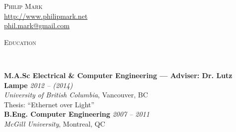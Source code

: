 \documentclass[10pt]{article}
\newenvironment{changemargin}[2]{%
  \begin{list}{}{%
    \setlength{\topsep}{0pt}%
    \setlength{\leftmargin}{#1}%
    \setlength{\rightmargin}{#2}%
    \setlength{\listparindent}{\parindent}%
    \setlength{\itemindent}{\parindent}%
    \setlength{\parsep}{\parskip}%
  }%
  \item[]}{\end{list}
}
\newcommand{\lineover}{
  \begin{changemargin}{-0.05in}{-0.05in}
    \vspace*{-8pt}
    \hrulefill \\
    \vspace*{-2pt}
  \end{changemargin}
}
\renewcommand{\section}[1]{
  \begin{changemargin}{-0.5in}{-0.5in}
    \normalsize \scshape{#1}\\
    \lineover
  \end{changemargin}
}
\newcommand{\contact}[3]{
  \begin{changemargin}{-0.5in}{-0.5in}
    \begin{center}
      {\LARGE \scshape {#1}}\\ \smallskip
      {\url{#2}}\\ \smallskip
      {\href{mailto:#3}{#3}}\\ \smallskip
    \end{center}
  \end{changemargin}
}
\newenvironment{body} {
  \vspace{2pt}
  \begin{changemargin}{-0.25in}{-0.5in}
    }{
  \end{changemargin}
}
\begin{document}
\contact{Philip Mark}{http://www.philipmark.net}{phil.mark@gmail.com}

% 
% 

\section{Education}
\begin{body}
\textbf{M.A.Sc Electrical \& Computer Engineering --- Adviser: Dr. Lutz Lampe}
\hfill \emph{2012 -- (2014)}{} \\
\emph{University of British Columbia}, Vancouver, BC \\
Thesis: ``Ethernet over Light''\\ %
\medskip
\textbf{B.Eng. Computer Engineering} \hfill \emph{2007 -- 2011} \\ \emph{McGill
University}, Montreal, QC \\
\end{body}
\bigskip

\end{document}
